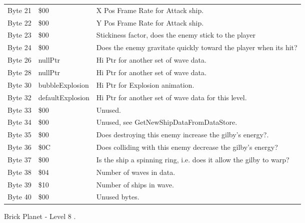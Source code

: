 \begin{figure}[H]
{\begin{adjustbox}{width=12cm}
\begin{tabular}{lll}
 Byte 21 & \$00              & X Pos Frame Rate for Attack ship.                                  \\
 Byte 22 & \$00              & Y Pos Frame Rate for Attack ship.                                  \\
 Byte 23 & \$00              & Stickiness factor, does the enemy stick to the player              \\
 Byte 24 & \$00              & Does the enemy gravitate quickly toward the player when its hit?   \\
 Byte 26 & nullPtr          & Hi Ptr for another set of wave data.                               \\
 Byte 28 & nullPtr          & Hi Ptr for another set of wave data.                               \\
 Byte 30 & bubbleExplosion  & Hi Ptr for Explosion animation.                                    \\
 Byte 32 & defaultExplosion & Hi Ptr for another set of wave data for this level.                \\
 Byte 33 & \$00              & Unused.                                                            \\
 Byte 34 & \$00              & Unused, see GetNewShipDataFromDataStore.                           \\
 Byte 35 & \$00              & Does destroying this enemy increase the gilby's energy?.           \\
 Byte 36 & \$0C              & Does colliding with this enemy decrease the gilby's energy?        \\
 Byte 37 & \$00              & Is the ship a spinning ring, i.e. does it allow the gilby to warp? \\
 Byte 38 & \$04              & Number of waves in data.                                           \\
 Byte 39 & \$10              & Number of ships in wave.                                           \\
 Byte 40 & \$00              & Unused bytes.                                                      \\
\bottomrule
\end{tabular}

  \end{adjustbox}

  }\caption*{Brick Planet - Level 8
.}
\end{figure}

\clearpage
